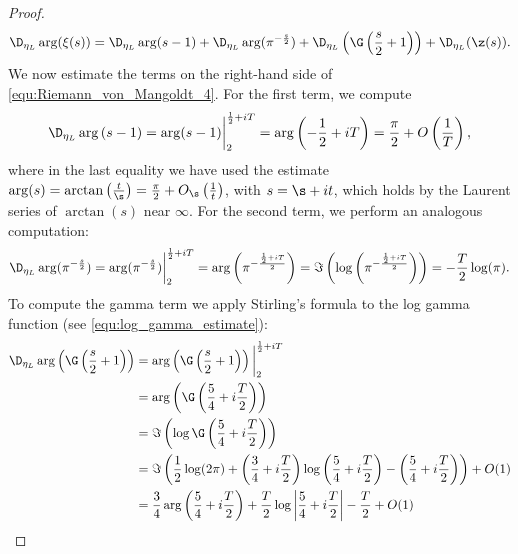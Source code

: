\begin{proof}
        \begin{equation}\label{equ:Riemann_von_Mangoldt_4}
          \D_{\eta_{L}}\arg(\xi(s)) = \D_{\eta_{L}}\arg(s-1)+\D_{\eta_{L}}\arg(\pi^{-\frac{s}{2}})+\D_{\eta_{L}}\left(\G\left(\frac{s}{2}+1\right)\right)+\D_{\eta_{L}}(\z(s)).
        \end{equation}
        We now estimate the terms on the right-hand side of \cref{equ:Riemann_von_Mangoldt_4}. For the first term, we compute
        \begin{equation}\label{equ:Riemann_von_Mangoldt_5}
          \D_{\eta_{L}}\arg\left(s-1\right) = \arg(s-1)\bigg|_{2}^{\frac{1}{2}+iT} = \arg\left(-\frac{1}{2}+iT\right) = \frac{\pi}{2}+O\left(\frac{1}{T}\right),
        \end{equation}
        where in the last equality we have used the estimate $\arg(s) = \arctan\left(\frac{t}{\s}\right) = \frac{\pi}{2}+O_{\s}\left(\frac{1}{t}\right)$, with $s = \s+it$, which holds by the Laurent series of $\arctan(s)$ near $\infty$. For the second term, we perform an analogous computation:
        \begin{equation}\label{equ:Riemann_von_Mangoldt_6}
          \D_{\eta_{L}}\arg(\pi^{-\frac{s}{2}}) = \arg(\pi^{-\frac{s}{2}})\bigg|_{2}^{\frac{1}{2}+iT} = \arg\left(\pi^{-\frac{\frac{1}{2}+iT}{2}}\right) = \Im\left(\log\left(\pi^{-\frac{\frac{1}{2}+iT}{2}}\right)\right) = -\frac{T}{2}\log(\pi).
        \end{equation}
        To compute the gamma term we apply Stirling's formula to the log gamma function (see \cref{equ:log_gamma_estimate}):
        \begin{equation}\label{equ:Riemann_von_Mangoldt_7}
          \begin{aligned}
            \D_{\eta_{L}}\arg\left(\G\left(\frac{s}{2}+1\right)\right) &= \arg\left(\G\left(\frac{s}{2}+1\right)\right)\bigg|_{2}^{\frac{1}{2}+iT} \\
            &= \arg\left(\G\left(\frac{5}{4}+i\frac{T}{2}\right)\right) \\
            &= \Im\left(\log\G\left(\frac{5}{4}+i\frac{T}{2}\right)\right) \\
            &= \Im\left(\frac{1}{2}\log(2\pi)+\left(\frac{3}{4}+i\frac{T}{2}\right)\log\left(\frac{5}{4}+i\frac{T}{2}\right)-\left(\frac{5}{4}+i\frac{T}{2}\right)\right)+O(1) \\
            &= \frac{3}{4}\arg\left(\frac{5}{4}+i\frac{T}{2}\right)+\frac{T}{2}\log\left|\frac{5}{4}+i\frac{T}{2}\right|-\frac{T}{2}+O(1) \\

\end{aligned}
\end{equation}
\end{proof}
